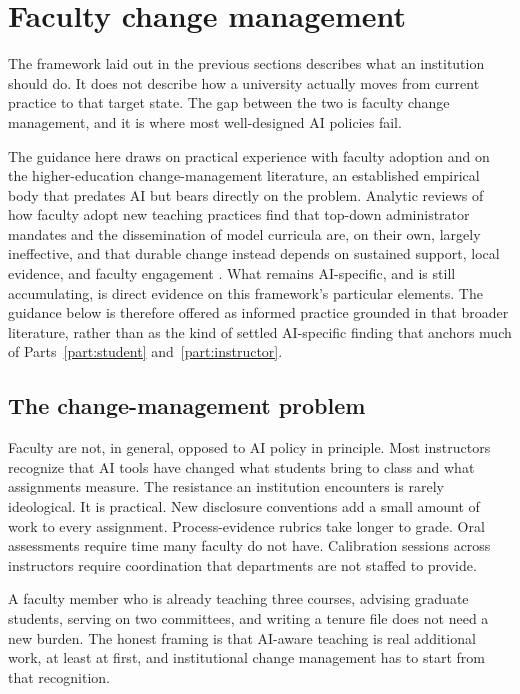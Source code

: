 \documentclass{SIAMbook2023}
\begin{document}
\section{Faculty change management}
\label{u:sec:change-management}%

The framework laid out in the previous sections describes what an institution should do. It does not describe how a university actually moves from current practice to that target state. The gap between the two is faculty change management, and it is where most well-designed AI policies fail.

The guidance here draws on practical experience with faculty adoption and on the higher-education change-management literature, an established empirical body that predates AI but bears directly on the problem. Analytic reviews of how faculty adopt new teaching practices find that top-down administrator mandates and the dissemination of model curricula are, on their own, largely ineffective, and that durable change instead depends on sustained support, local evidence, and faculty engagement \citep{henderson2011facilitating,borrego2014increasing,kezar2013colleges}. What remains AI-specific, and is still accumulating, is direct evidence on this framework's particular elements. The guidance below is therefore offered as informed practice grounded in that broader literature, rather than as the kind of settled AI-specific finding that anchors much of Parts~\ref{part:student} and~\ref{part:instructor}.

\subsection{The change-management problem}
\label{u:subsec:change-problem}

Faculty are not, in general, opposed to AI policy in principle. Most instructors recognize that AI tools have changed what students bring to class and what assignments measure. The resistance an institution encounters is rarely ideological. It is practical. New disclosure conventions add a small amount of work to every assignment. Process-evidence rubrics take longer to grade. Oral assessments require time many faculty do not have. Calibration sessions across instructors require coordination that departments are not staffed to provide.

A faculty member who is already teaching three courses, advising graduate students, serving on two committees, and writing a tenure file does not need a new burden. The honest framing is that AI-aware teaching is real additional work, at least at first, and institutional change management has to start from that recognition.
\end{document}
